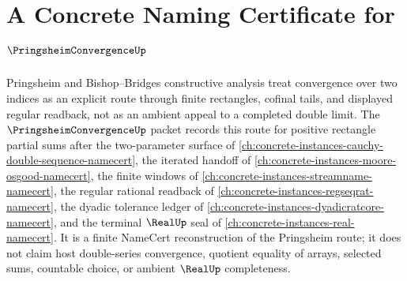 \chapter{A Concrete Naming Certificate for $\PringsheimConvergenceUp$}
\label{ch:concrete-instances-pringsheim-convergence-namecert}

Pringsheim and Bishop--Bridges constructive analysis treat convergence over two indices as an explicit route through finite rectangles, cofinal tails, and displayed regular readback, not as an ambient appeal to a completed double limit. The $\PringsheimConvergenceUp$ packet records this route for positive rectangle partial sums after the two-parameter surface of \autoref{ch:concrete-instances-cauchy-double-sequence-namecert}, the iterated handoff of \autoref{ch:concrete-instances-moore-osgood-namecert}, the finite windows of \autoref{ch:concrete-instances-streamname-namecert}, the regular rational readback of \autoref{ch:concrete-instances-regseqrat-namecert}, the dyadic tolerance ledger of \autoref{ch:concrete-instances-dyadicratcore-namecert}, and the terminal $\RealUp$ seal of \autoref{ch:concrete-instances-real-namecert}. It is a finite NameCert reconstruction of the Pringsheim route; it does not claim host double-series convergence, quotient equality of arrays, selected sums, countable choice, or ambient $\RealUp$ completeness.

